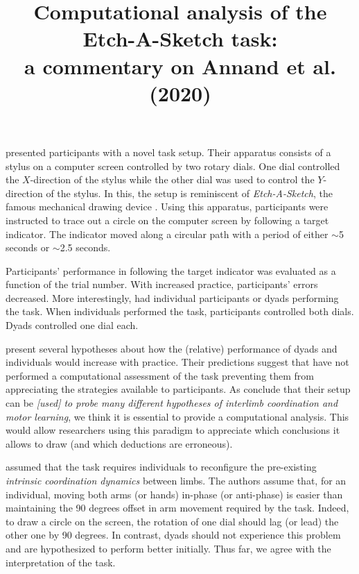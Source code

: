 \documentclass[11pt]{article}
\title{Computational analysis of the Etch-A-Sketch task:\\ a commentary on Annand et al. (2020)}
\author{}
\begin{document}
\maketitle


\citet{Annand2020} presented participants with a novel task setup. Their apparatus consists of a stylus on a computer screen controlled by two rotary dials. One dial controlled the $X$-direction of the stylus while the other dial was used to control the $Y$-direction of the stylus. In this, the setup is reminiscent of \textit{Etch-A-Sketch}, the famous mechanical drawing device \citep{EtchASketch}. Using this apparatus, participants were instructed to trace out a circle on the computer screen by following a target indicator. The indicator moved along a circular path with a period of either $\sim$5 seconds or  $\sim$2.5 seconds.

Participants' performance in following the target indicator was evaluated as a function of the trial number. With increased practice, participants' errors decreased. More interestingly, \citet{Annand2020} had individual participants or dyads performing the task. When individuals performed the task, participants controlled both dials. Dyads controlled one dial each.

\citet{Annand2020} present several hypotheses about how the (relative) performance of dyads and individuals would increase with practice. Their predictions suggest that \citet{Annand2020} have not performed a computational assessment of the task preventing them from appreciating the strategies available to participants. As \citet{Annand2020} conclude that their setup can be \textit{[used] to probe many different hypotheses of interlimb coordination and motor learning}, we think it is essential to provide a computational analysis. This would allow researchers using this paradigm to appreciate which conclusions it allows to draw (and which deductions are erroneous).

\citet{Annand2020} assumed that the task requires individuals to reconfigure the pre-existing \textit{intrinsic coordination dynamics} between limbs. The authors assume that, for an individual, moving both arms (or hands) in-phase (or anti-phase) is easier than maintaining the 90 degrees offset in arm movement required by the task. Indeed, to draw a circle on the screen, the rotation of one dial should lag (or lead) the other one by 90 degrees. In contrast, dyads should not experience this problem and are hypothesized to perform better initially. Thus far, we agree with the interpretation of the task.
\end{document}
